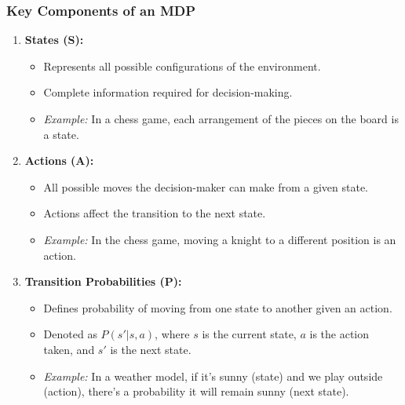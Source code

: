 \documentclass[aspectratio=169]{beamer}
\begin{document}
\begin{frame}[fragile]
    \frametitle{Key Components of an MDP}
    \begin{enumerate}
        \item \textbf{States (S):}
        \begin{itemize}
            \item Represents all possible configurations of the environment.
            \item Complete information required for decision-making.
            \item \textit{Example:} In a chess game, each arrangement of the pieces on the board is a state.
        \end{itemize}
        
        \item \textbf{Actions (A):}
        \begin{itemize}
            \item All possible moves the decision-maker can make from a given state.
            \item Actions affect the transition to the next state.
            \item \textit{Example:} In the chess game, moving a knight to a different position is an action.
        \end{itemize}

        \item \textbf{Transition Probabilities (P):}
        \begin{itemize}
            \item Defines probability of moving from one state to another given an action.
            \item Denoted as $P(s'|s, a)$, where $s$ is the current state, $a$ is the action taken, and $s'$ is the next state.
            \item \textit{Example:} In a weather model, if it's sunny (state) and we play outside (action), there's a probability it will remain sunny (next state).
        \end{itemize}
    \end{enumerate}
\end{frame}
\end{document}
